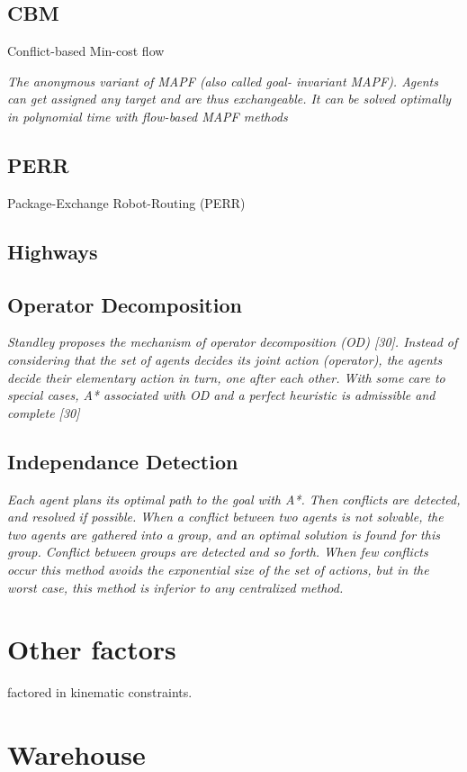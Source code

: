 \documentclass[a4paper,11pt]{article}
\begin{document}
\subsection{CBM}
Conflict-based Min-cost flow

\textit{The anonymous variant of MAPF (also called goal- invariant MAPF). Agents can get assigned any target and are thus exchangeable. It can be solved optimally in polynomial time with flow-based MAPF methods}

\subsection{PERR}
Package-Exchange Robot-Routing (PERR)

\subsection{Highways}
\cite{cohen2016bounded}

\subsection{Operator Decomposition}
\textit{Standley proposes the mechanism of operator decomposition (OD) [30]. Instead of considering that the set of agents decides its joint action (operator), the agents decide their elementary action in turn, one after each other. With some care to special cases, A* associated with OD and a perfect heuristic is admissible and complete [30]}

\subsection{Independance Detection}
\textit{Each agent plans its optimal path to the goal with A*. Then conflicts are detected, and resolved if possible. When a conflict between two agents is not solvable, the two agents are gathered into a group, and an optimal solution is found for this group. Conflict between groups are detected and so forth. When few conflicts occur this method avoids the exponential size of the set of actions, but in the worst case, this method is inferior to any centralized method.}


\section{Other factors}
\cite{honig2016multi} factored in kinematic constraints.

\section{Warehouse}
\end{document}
